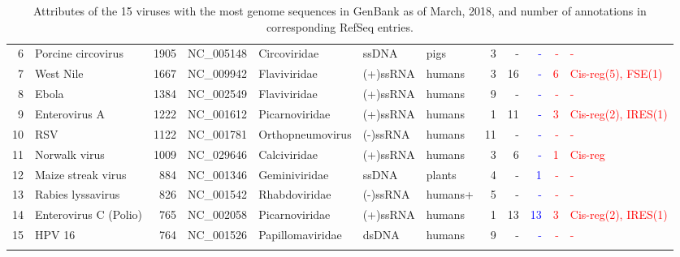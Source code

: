 \begin{table}
\begin{center}
\begin{tabular}{|r|l|r|l|l|l|l||r|r|r||r|l||}
     6 & Porcine circovirus &        1905  & NC\_005148      & Circoviridae   & ssDNA    & pigs   &     3 &        - & \textcolor{blue}{-}        & \textcolor{red}{-}        & \textcolor{red}{-} \\
     7 & West Nile          &        1667  & NC\_009942      & Flaviviridae   & (+)ssRNA & humans &     3 &       16 & \textcolor{blue}{-}        & \textcolor{red}{6}        & \textcolor{red}{Cis-reg(5), FSE(1)} \\
     8 & Ebola              &        1384  & NC\_002549      & Flaviviridae   & (+)ssRNA & humans &     9 &        - & \textcolor{blue}{-}        & \textcolor{red}{-}        & \textcolor{red}{-} \\ 
     9 & Enterovirus A      &        1222  & NC\_001612      & Picarnoviridae & (+)ssRNA & humans &     1 &       11 & \textcolor{blue}{-}        & \textcolor{red}{3}        & \textcolor{red}{Cis-reg(2), IRES(1)} \\
    10 & RSV                &        1122  & NC\_001781      &Orthopneumovirus& (-)ssRNA & humans &    11 &        - & \textcolor{blue}{-}        & \textcolor{red}{-}        & \textcolor{red}{-} \\
    11 & Norwalk virus      &        1009  & NC\_029646      & Calciviridae   & (+)ssRNA & humans &     3 &        6 & \textcolor{blue}{-}        & \textcolor{red}{1}        & \textcolor{red}{Cis-reg} \\ 
    12 & Maize streak virus &         884  & NC\_001346      & Geminiviridae  & ssDNA    & plants &     4 &        - & \textcolor{blue}{1}        & \textcolor{red}{-}        & \textcolor{red}{-}  \\
    13 & Rabies lyssavirus  &         826  & NC\_001542      & Rhabdoviridae  & (-)ssRNA & humans+&     5 &        - & \textcolor{blue}{-}        & \textcolor{red}{-}        & \textcolor{red}{-}  \\
    14 & Enterovirus C (Polio) &      765  & NC\_002058      & Picarnoviridae & (+)ssRNA & humans &     1 &       13 & \textcolor{blue}{13}       & \textcolor{red}{3}        & \textcolor{red}{Cis-reg(2), IRES(1)} \\
    15 & HPV 16             &         764  & NC\_001526      &Papillomaviridae& dsDNA    & humans &     9 &        - & \textcolor{blue}{-}        & \textcolor{red}{-}        & \textcolor{red}{-} \\ \hline
\multicolumn{12}{c}{} \\
\end{tabular}
\caption{Attributes of the 15 viruses with the most genome sequences in GenBank as of March, 2018, and number of annotations in corresponding RefSeq entries.}
\label{tbl}
\end{center}
\end{table}

